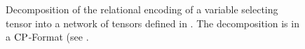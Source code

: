 
%




\begin{figure}[h]
\begin{center}
	
\end{center}
\caption{Decomposition of the relational encoding of a variable selecting tensor into a network of tensors defined in .
	The decomposition is in a $\mathrm{CP}$-Format (see . %
}
\label{fig:SelectorDecomposition}
\end{figure}




